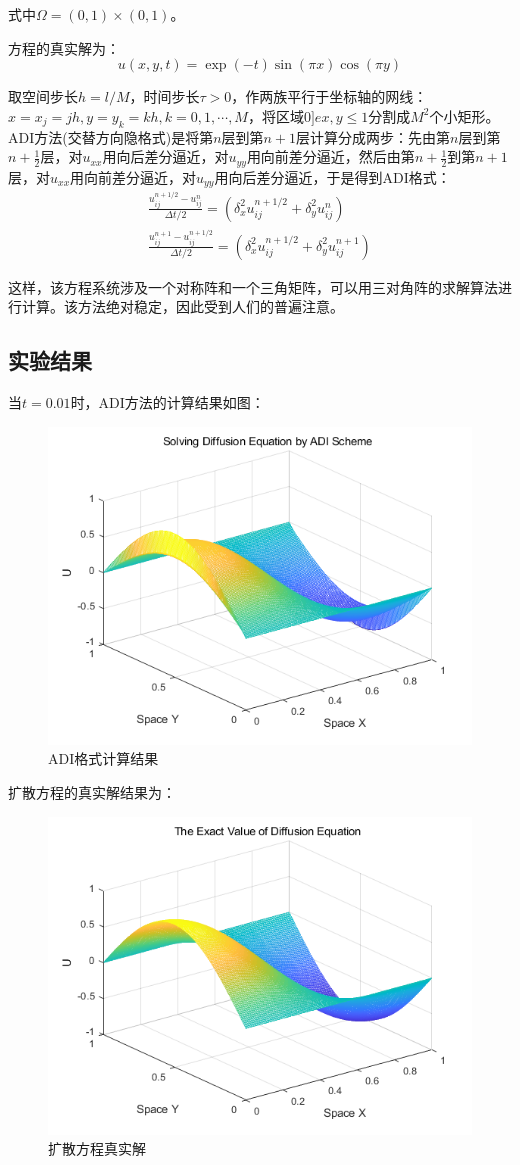 \documentclass[fontset=mac]{ctexart}
\begin{document}
	式中$\Omega = (0,1) \times (0,1)$。
	
	方程的真实解为：
	$$
	u(x,y,t) = \exp (-t) \sin(\pi x) \cos(\pi y)
	$$
	
	取空间步长$h = l/M$，时间步长$\tau > 0$，作两族平行于坐标轴的网线：$x = x_j = jh, y = y_k = kh,k=0,1,\cdots,M$，将区域$0 ]e x,y \le 1$分割成$M^2$个小矩形。ADI方法(交替方向隐格式)是将第$n$层到第$n+1$层计算分成两步：先由第$n$层到第$n+\frac{1}{2}$层，对$u_{xx}$用向后差分逼近，对$u_{yy}$用向前差分逼近，然后由第$n+\frac{1}{2}$到第$n+1$层，对$u_{xx}$用向前差分逼近，对$u_{yy}$用向后差分逼近，于是得到ADI格式：
	$$
	\begin{array}{l}
		\frac{u_{i j}^{n+1 / 2}-u_{i j}^{n}}{\Delta t / 2}=\left(\delta_{x}^{2} u_{i j}^{n+1 / 2}+\delta_{y}^{2} u_{i j}^{n}\right) \\
		\frac{u_{i j}^{n+1}-u_{i j}^{n+1 / 2}}{\Delta t / 2}=\left(\delta_{x}^{2} u_{i j}^{n+1 / 2}+\delta_{y}^{2} u_{i j}^{n+1}\right)
	\end{array}
	$$
	
	这样，该方程系统涉及一个对称阵和一个三角矩阵，可以用三对角阵的求解算法进行计算。该方法绝对稳定，因此受到人们的普遍注意。
	
	\subsection{实验结果}
	当$t=0.01$时，ADI方法的计算结果如图：
	\begin{figure}[H]
		\centering
		\includegraphics[width=0.7\linewidth]{fig/adi}
		\caption{ADI格式计算结果}
	\end{figure}
	
	扩散方程的真实解结果为：
	\begin{figure}[H]
		\centering
		\includegraphics[width=0.7\linewidth]{fig/exact}
		\caption{扩散方程真实解}
	\end{figure}
	
\end{document}
